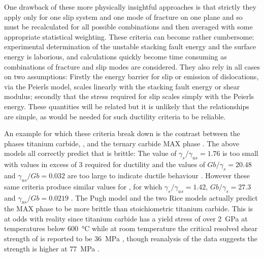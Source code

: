 One drawback of these more physically insightful approaches is that strictly they apply only for one slip system and one mode of fracture on one plane and so must be recalculated for all possible combinations and then averaged with some appropriate statistical weighting. These criteria can become rather cumbersome: experimental determination of the unstable stacking fault energy and the surface energy is laborious, and calculations quickly become time consuming as combinations of fracture and slip modes are considered. They also rely in all cases on two assumptions: Firstly the energy barrier for slip or emission of dislocations, via the Peierls model, scales linearly with the stacking fault energy or shear modulus; secondly that the stress required for slip scales simply with the Peierls energy. These quantities will be related but it is unlikely that the relationships are simple, as would be needed for such ductility criteria to be reliable.

An example for which these criteria break down is the contrast between the phases titanium carbide, , and the ternary carbide MAX phase . The above models all correctly predict that  is brittle: The value of $\gamma_s / \gamma_{us} = 1.76$ is too small with values in excess of 3 required for ductility \cite{Price1992,Yu2003} and the values of $Gb/\gamma_s = 20.48$ and $\gamma_{us} / Gb = 0.032$ are too large to indicate ductile behaviour \cite{Yu2003,Medvedeva2011}. However these same criteria produce similar values for , for which $\gamma_s / \gamma_{us} = 1.42$, $Gb/\gamma_s = 27.3$ and $\gamma_{us} / Gb = 0.0219$ \cite{Medvedeva2011,Farle2015}. The Pugh model and the two Rice models \cite{Pugh1954,rice1974,Rice1992} actually predict the MAX phase to be more brittle than stoichiometric titanium carbide. This is at odds with reality since titanium carbide has a yield stress of over \SI{2}{\giga\pascal} at temperatures below \SI{600}{\celsius} \cite{Miracle1983} while at room temperature the critical resolved shear strength of  is reported to be \SI{36}{\mega\pascal} \cite{Barsoum1999}, though reanalysis of the data suggests the strength is higher at \SI{77}{\mega\pascal} \cite{Humphrey2012}.


